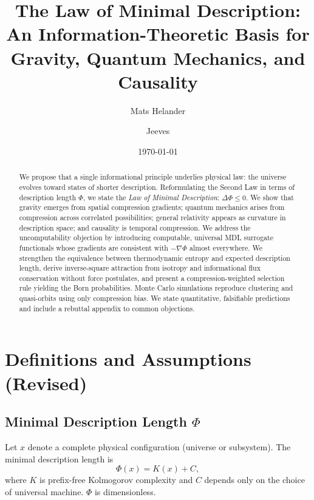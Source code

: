 \documentclass[aps,preprint,onecolumn,longbibliography,nofootinbib]{revtex4-2}
\numberwithin{equation}{section}        %
\begin{document}
\title{The Law of Minimal Description: An Information-Theoretic Basis for Gravity, Quantum Mechanics, and Causality}

\author{Mats Helander}
\author{Jeeves}

\date{\today}

\begin{abstract}
We propose that a single informational principle underlies physical law: the universe evolves toward states of shorter description. Reformulating the Second Law in terms of description length $\Phi$, we state the \emph{Law of Minimal Description}: $\Delta\Phi \le 0$. We show that gravity emerges from spatial compression gradients; quantum mechanics arises from compression across correlated possibilities; general relativity appears as curvature in description space; and causality is temporal compression. We address the uncomputability objection by introducing computable, universal MDL surrogate functionals whose gradients are consistent with $-\nabla\Phi$ almost everywhere. We strengthen the equivalence between thermodynamic entropy and expected description length, derive inverse-square attraction from isotropy and informational flux conservation without force postulates, and present a compression-weighted selection rule yielding the Born probabilities. Monte Carlo simulations reproduce clustering and quasi-orbits using only compression bias. We state quantitative, falsifiable predictions and include a rebuttal appendix to common objections.
\end{abstract}

\maketitle
{}
\thispagestyle{empty}
\vspace{-0.5em}

\section{Definitions and Assumptions (Revised)}
\subsection{Minimal Description Length $\Phi$}
Let $x$ denote a complete physical configuration (universe or subsystem). The minimal description length is
\begin{equation}
\Phi(x) = K(x) + C, \label{eq:Kdef}
\end{equation}
where $K$ is prefix-free Kolmogorov complexity and $C$ depends only on the choice of universal machine. $\Phi$ is dimensionless.
\end{document}
